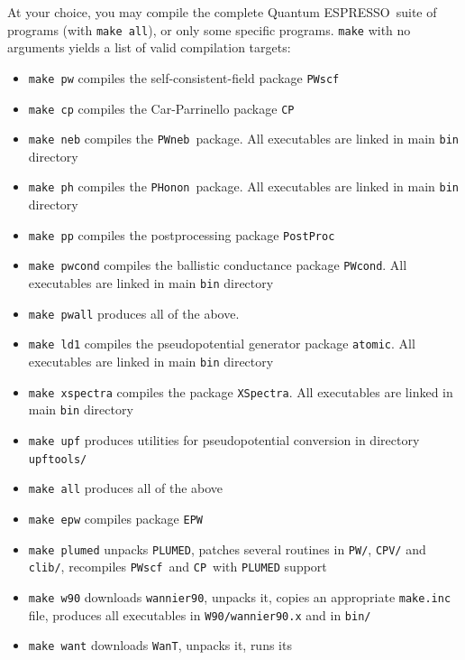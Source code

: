 \documentclass[12pt,a4paper]{article}
\def\qe{{\sc Quantum ESPRESSO}}
\def\PWscf{\texttt{PWscf}}
\def\PHonon{\texttt{PHonon}}
\def\CP{\texttt{CP}}
\def\PostProc{\texttt{PostProc}}
\def\NEB{\texttt{PWneb}}
\begin{document}
At your choice, you may compile the complete \qe\ suite of programs
(with \texttt{make all}), or only some specific programs.
\texttt{make} with no arguments yields a list of valid compilation targets:
\begin{itemize}
\item \texttt{make pw}  compiles the self-consistent-field package \PWscf
\item \texttt{make cp}  compiles the Car-Parrinello package \CP
\item \texttt{make neb} compiles the \NEB\ package. All executables are linked
			in main \texttt{bin} directory
\item \texttt{make ph}  compiles the \PHonon\ package. All executables are linked
			in main \texttt{bin} directory
\item \texttt{make pp}  compiles the postprocessing package \PostProc
\item \texttt{make pwcond} compiles the ballistic conductance package 
	                \texttt{PWcond}. All executables are linked
			in main \texttt{bin} directory
\item \texttt{make pwall} produces all of the above.
\item \texttt{make ld1}  compiles the pseudopotential generator package 
	                 \texttt{atomic}. All executables are linked
			in main \texttt{bin} directory
\item \texttt{make xspectra} compiles the package \texttt{XSpectra}.
			All executables are linked
			in main \texttt{bin} directory
\item \texttt{make upf} produces utilities for pseudopotential conversion in
                        directory \texttt{upftools/}
\item \texttt{make all} produces all of the above
\item \texttt{make epw} compiles package \texttt{EPW}
\item \texttt{make plumed} unpacks \texttt{PLUMED}, patches several routines
                           in \texttt{PW/}, \texttt{CPV/} and \texttt{clib/},
                           recompiles \PWscf\ and \CP\ with \texttt{PLUMED}
                           support
\item \texttt{make w90} downloads \texttt{wannier90}, unpacks it, copies an appropriate
                       \texttt{make.inc} file,  produces all executables
                       in \texttt{W90/wannier90.x} and in \texttt{bin/}
\item \texttt{make want} downloads \texttt{WanT}, unpacks it, runs its 

\end{itemize}
\end{document}
